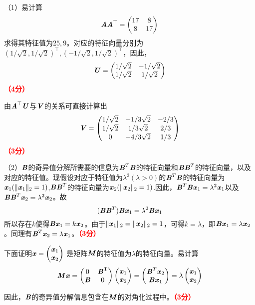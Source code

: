 \documentclass[12pt,a4paper,openany,twoside]{ctexbook}
\begin{document}
\begin{Solution}
	（1）易计算
			$$\MA \MA^\top=\begin{pmatrix}
				17& 8\\
				8& 17\end{pmatrix}$$
		求得其特征值为$25,9$。对应的特征向量分别为$(1/\sqrt{2},1/\sqrt{2})^\top, (-1/\sqrt{2},1/\sqrt{2})^\top$，因此，
		$$\MU =\begin{pmatrix}
			1/\sqrt{2}& -1/\sqrt{2}\\
			1/\sqrt{2}& 1/\sqrt{2}\end{pmatrix}$$\hfill \textcolor{red}{\textbf{（4分）}}
		
		由$\MA^\top \MU$与$\MV$的关系可直接计算出
		$$\MV =\begin{pmatrix}
			1/\sqrt{2}& -1/3\sqrt{2}& -2/3\\
			1/\sqrt{2}& 1/3\sqrt{2} & 2/3\\
			0& -4/3\sqrt{2} & 1/3
	\end{pmatrix}$$\hfill \textcolor{red}{\textbf{（3分）}}

	（2）$\MB$的奇异值分解所需要的信息为$\MB^T \MB$的特征向量和$\MB \MB^T$的特征向量，以及对应的特征值。现假设对应于特征值为$\lambda^2(\lambda>0)$的$\MB^T \MB$的特征向量为$\Vx_1(\|\Vx_1\|_2=1)$,$\MB \MB^T$的特征向量为$\Vx_2(\|\Vx_2\|_2=1)$.因此，$\MB^T \MB \Vx_1 = \lambda^2 \Vx_1$以及$\MB \MB^T \Vx_2 = \lambda^2 \Vx_2$。故
	$$(\MB \MB^T) \MB \Vx_1 = \lambda^2 \MB \Vx_1$$
	所以存在$k$使得$\MB \Vx_1=k\Vx_2$。由于$\|\Vx_1\|_2=\|\Vx_2\|_2=1$，可得$k=\lambda$，即$\MB \Vx_1 = \lambda \Vx_2$。同理有$\MB^T \Vx_2 = \lambda \Vx_1 $。\hfill \textcolor{red}{\textbf{（3分）}}
	
	下面证明$\Vx=\begin{pmatrix}
		\Vx_1\\
		\Vx_2\end{pmatrix}$
	是矩阵$\MM$的特征值为$\lambda$的特征向量。易计算
	$$\MM\Vx = \begin{pmatrix}
		0& \MB^\mathrm{T}\\
		\MB& 0\end{pmatrix} 
	\begin{pmatrix}
		\Vx_1\\
		\Vx_2\end{pmatrix}=
	\begin{pmatrix}
		\MB^T \Vx_2\\
		\MB \Vx_1\end{pmatrix}
	=\lambda \begin{pmatrix}
		\Vx_1\\
		\Vx_2\end{pmatrix}$$
	
	因此，$\MB$的奇异值分解信息包含在$\MM$的对角化过程中。\hfill \textcolor{red}{\textbf{（3分）}}
\end{Solution}
\end{document}
